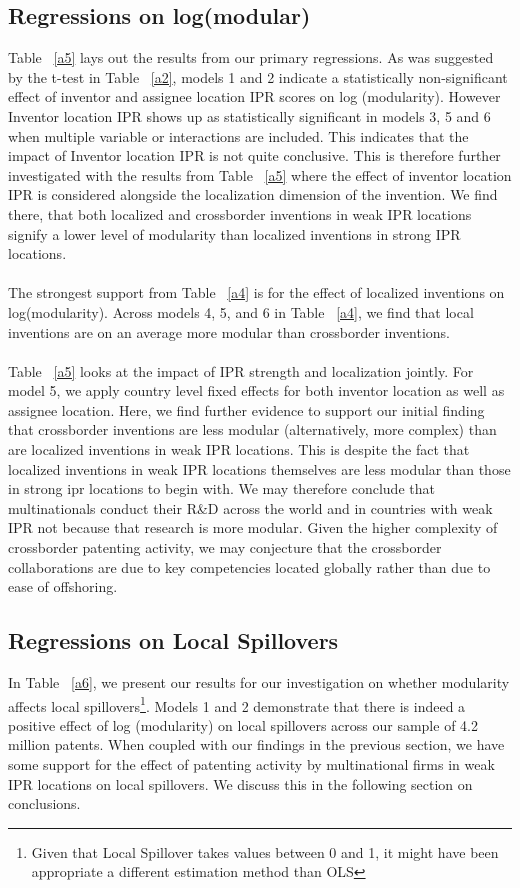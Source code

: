 \documentclass[12pt]{article}
\begin{document}
\subsection{Regressions on log(modular)}
Table ~\ref{a5} lays out the results from our primary regressions. As was suggested by the t-test in Table ~\ref{a2}, models 1 and 2 indicate a statistically non-significant effect of inventor and assignee location IPR scores on log (modularity). However Inventor location IPR shows up as statistically significant in models 3, 5 and 6 when multiple variable or interactions are included. This indicates that the impact of Inventor location IPR is not quite conclusive. This is therefore further investigated with the results from Table ~\ref{a5} where the effect of inventor location IPR is considered alongside the localization dimension of the invention. We find there, that both localized and crossborder inventions in weak IPR locations signify a lower level of modularity than localized inventions in strong IPR locations.
\\\\
The strongest support from Table ~\ref{a4} is for the effect of localized inventions on log(modularity). Across models 4, 5, and 6 in Table ~\ref{a4}, we find that local inventions are on an average more modular than crossborder inventions.
\\\\
Table ~\ref{a5} looks at the impact of IPR strength and localization jointly. For model 5, we apply country level fixed effects for both inventor location as well as assignee location. Here, we find further evidence to support our initial finding that crossborder inventions are less modular (alternatively, more complex) than are localized inventions in weak IPR locations. This is despite the fact that localized inventions in weak IPR locations themselves are less modular than those in strong ipr locations to begin with. We may therefore conclude that multinationals conduct their R\&D across the world and in countries with weak IPR not because that research is more modular. Given the higher complexity of crossborder patenting activity, we may conjecture that the crossborder collaborations are due to key competencies located globally rather than due to ease of offshoring.

\subsection{Regressions on Local Spillovers}
In Table ~\ref{a6}, we present our results for our investigation on whether modularity affects local spillovers\footnote{Given that Local Spillover takes values between 0 and 1, it might have been appropriate a different estimation method than OLS}. Models 1 and 2 demonstrate that there is indeed a positive effect of log (modularity) on local spillovers across our sample of 4.2 million patents. When coupled with our findings in the previous section, we have some support for the effect of patenting activity by multinational firms in weak IPR locations on local spillovers. We discuss this in the following section on conclusions.
\end{document}

